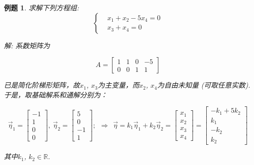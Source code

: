 \documentclass[a4paper]{book}
\newtheorem{eg}{例题}[chapter]
\begin{document}
\begin{eg}
求解下列方程组:
\begin{displaymath}\left\{\begin{aligned}
&x_1+x_2-5x_4=0\\
&x_3+x_4=0\end{aligned}\right.\end{displaymath}

解: 系数矩阵为

\begin{displaymath}A=\begin{bmatrix}1&1&0&-5\\0&0&1&1\end{bmatrix}\end{displaymath}

已是简化阶梯形矩阵，故$x_1$, $x_3$为主变量，而$x_2$, $x_4$为自由未知量 (可取任意实数). 于是，取基础解系和通解分别为：

\begin{displaymath}
\vec{\eta}_1=\begin{bmatrix}-1\\1\\0\\0\end{bmatrix},\ \vec{\eta}_2= \begin{bmatrix}5\\0\\-1\\1\end{bmatrix}; \ \ \Rightarrow \ \ \vec{\eta}=k_1\vec{\eta}_1+k_2\vec{\eta}_2=\begin{bmatrix}x_1\\x_2\\x_3\\x_4
\end{bmatrix}=\begin{bmatrix}-k_1+5k_2\\k_1\\-k_2\\k_2\end{bmatrix}\end{displaymath}

其中$k_1$, $k_2\in\mathbb{R}$.
\end{eg}
\end{document}

